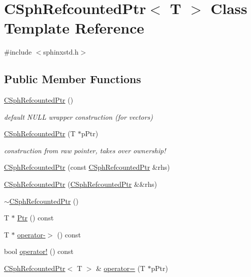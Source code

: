 \hypertarget{classCSphRefcountedPtr}{\section{C\-Sph\-Refcounted\-Ptr$<$ T $>$ Class Template Reference}
\label{classCSphRefcountedPtr}
}


{\ttfamily \#include $<$sphinxstd.\-h$>$}

\subsection*{Public Member Functions}
\begin{DoxyCompactItemize}
\item 
\hyperlink{classCSphRefcountedPtr_aef9ccbecbe79873ac7ab5374ca025e35}{C\-Sph\-Refcounted\-Ptr} ()
\begin{DoxyCompactList}\small\item\em default N\-U\-L\-L wrapper construction (for vectors) \end{DoxyCompactList}\item 
\hyperlink{classCSphRefcountedPtr_a526110be0e4dfcc510d99247645dc567}{C\-Sph\-Refcounted\-Ptr} (T $\ast$p\-Ptr)
\begin{DoxyCompactList}\small\item\em construction from raw pointer, takes over ownership! \end{DoxyCompactList}\item 
\hyperlink{classCSphRefcountedPtr_ad391c2977b8f14066d4b78ee72af44b6}{C\-Sph\-Refcounted\-Ptr} (const \hyperlink{classCSphRefcountedPtr}{C\-Sph\-Refcounted\-Ptr} \&rhs)
\item 
\hyperlink{classCSphRefcountedPtr_ae937bbdd53285c4da0ffb56a2277047c}{C\-Sph\-Refcounted\-Ptr} (\hyperlink{classCSphRefcountedPtr}{C\-Sph\-Refcounted\-Ptr} \&\&rhs)
\item 
\hyperlink{classCSphRefcountedPtr_adfe0b7440e8d1bf72233198eaf9511d8}{$\sim$\-C\-Sph\-Refcounted\-Ptr} ()
\item 
T $\ast$ \hyperlink{classCSphRefcountedPtr_ab25d2073ef1be887dcc10fe66bb9f631}{Ptr} () const 
\item 
T $\ast$ \hyperlink{classCSphRefcountedPtr_a5da198e6fdccabd11671f12064549d2a}{operator-\/$>$} () const 
\item 
bool \hyperlink{classCSphRefcountedPtr_a09e4e6ce7d58bd719e273e78727d8ef5}{operator!} () const 
\item 
\hyperlink{classCSphRefcountedPtr}{C\-Sph\-Refcounted\-Ptr}$<$ T $>$ \& \hyperlink{classCSphRefcountedPtr_a2d9960182f99a7e7f10d03ad4d322023}{operator=} (T $\ast$p\-Ptr)

\end{DoxyCompactItemize}

